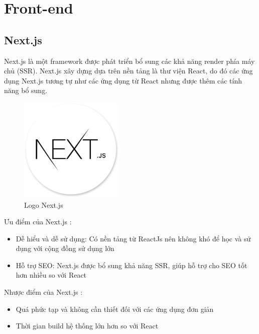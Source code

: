 
\section{Front-end}
\subsection{Next.js}

\hspace*{0.5cm} Next.js là một framework được phát triển bổ sung các khả năng render phía máy chủ (SSR). Next.js xây dựng dựa trên nền tảng là thư viện React, do đó các ứng dụng Next.js tương tự như các ứng dụng từ React nhưng được thêm các tính năng bổ sung.\\

\begin{figure}[!htp]
    \begin{center}
        \includegraphics[width=5cm]{img/Technology/next.png}
    \end{center}
    \caption{Logo Next.js \cite{technologyNextjs}}
\end{figure}

Ưu điểm của Next.js \cite{technologyNextAdvance}:
\begin{itemize}
    \item Dễ hiểu và dễ sử dụng: Có nền tảng từ ReactJs nên không khó để học và sử dụng với cộng đồng sử dụng lớn
    \item Hỗ trợ SEO: Next.js được bổ sung khả năng SSR, giúp hỗ trợ cho SEO tốt hơn nhiều so với React
\end{itemize}

Nhược điểm của Next.js \cite{technologyReactAdvance}:
\begin{itemize}
    \item Quá phức tạp và không cần thiết đối với các ứng dụng đơn giản
    \item Thời gian build hệ thống lớn hơn so với React
\end{itemize}

